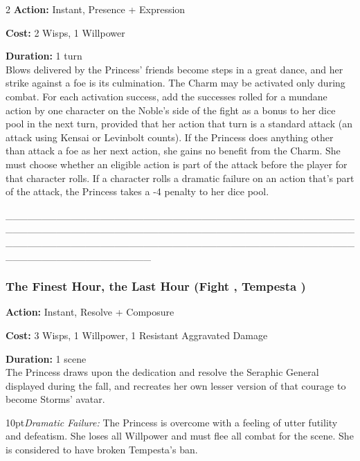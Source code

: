 \begin{multicols}{2}
\noindent \textbf{Action:} Instant, Presence + Expression

\noindent \textbf{Cost:} 2 Wisps, 1 Willpower

\noindent \textbf{Duration:} 1 turn\\

\noindent Blows delivered by the Princess' friends become steps in a great dance, and her strike against a foe is its culmination. The Charm may be activated only during combat. For each activation success, add the successes rolled for a mundane action by one character on the Noble's side of the fight as a bonus to her dice pool in the next turn, provided that her action that turn is a standard attack (an attack using Kensai or Levinbolt counts). If the Princess does anything other than attack a foe as her next action, she gains no benefit from the Charm. She must choose whether an eligible action is part of the attack before the player for that character rolls. If a character rolls a dramatic failure on an action that's part of the attack, the Princess takes a -4 penalty to her dice pool.



____________________________________________________________________________________________________________________________________________________________________




\subsubsection*{The Finest Hour, the Last Hour (Fight \textbullet\textbullet\textbullet\textbullet\textbullet, Tempesta \textbullet\textbullet\textbullet\textbullet)}

\noindent \textbf{Action:} Instant, Resolve + Composure

\noindent \textbf{Cost:} 3 Wisps, 1 Willpower, 1 Resistant Aggravated Damage

\noindent \textbf{Duration:} 1 scene \\

\noindent The Princess draws upon the dedication and resolve the Seraphic General displayed during the fall, and recreates her own lesser version of that courage to become Storms' avatar. 

    \begin{myindentpar}{10pt}\emph{Dramatic Failure:} The Princess is overcome with a feeling of utter futility and defeatism. She loses all Willpower and must flee all combat for the scene. She is considered to have broken Tempesta's ban.


\end{myindentpar}
\end{multicols}
